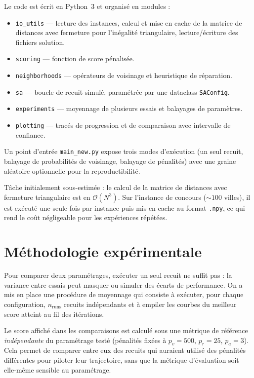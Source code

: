 \documentclass[11pt,a4paper]{article}
\begin{document}
Le code est écrit en Python~3 et organisé en modules :
\begin{itemize}
  \item \texttt{io\_utils} — lecture des instances, calcul et mise en cache de la
    matrice de distances avec fermeture pour l'inégalité triangulaire,
    lecture/écriture des fichiers solution.
  \item \texttt{scoring} — fonction de score pénalisée.
  \item \texttt{neighborhoods} — opérateurs de voisinage et heuristique de réparation.
  \item \texttt{sa} — boucle de recuit simulé, paramétrée par une dataclass
    \texttt{SAConfig}.
  \item \texttt{experiments} — moyennage de plusieurs essais et balayages de paramètres.
  \item \texttt{plotting} — tracés de progression et de comparaison avec intervalle
    de confiance.
\end{itemize}

Un point d'entrée \texttt{main\_new.py} expose trois modes d'exécution (un seul recuit,
balayage de probabilités de voisinage, balayage de pénalités) avec une graine aléatoire
optionnelle pour la reproductibilité.

Tâche initialement sous-estimée : le calcul de la matrice de distances avec fermeture
triangulaire est en $\mathcal{O}(N^3)$. Sur l'instance de concours (${\sim}100$ villes),
il est exécuté une seule fois par instance puis mis en cache au format \texttt{.npy},
ce qui rend le coût négligeable pour les expériences répétées.

\section{Méthodologie expérimentale}
\label{sec:methodo}

Pour comparer deux paramétrages, exécuter un seul recuit ne suffit pas : la variance
entre essais peut masquer ou simuler des écarts de performance. On a mis en place une
procédure de moyennage qui consiste à exécuter, pour chaque configuration,
$n_{\text{runs}}$ recuits indépendants et à empiler les courbes du meilleur score
atteint au fil des itérations.

Le score affiché dans les comparaisons est calculé sous une métrique de référence
\emph{indépendante} du paramétrage testé (pénalités fixées à $p_v = 500$, $p_r = 25$,
$p_a = 3$). Cela permet de comparer entre eux des recuits qui auraient utilisé des
pénalités différentes pour piloter leur trajectoire, sans que la métrique d'évaluation
soit elle-même sensible au paramétrage.
\end{document}
